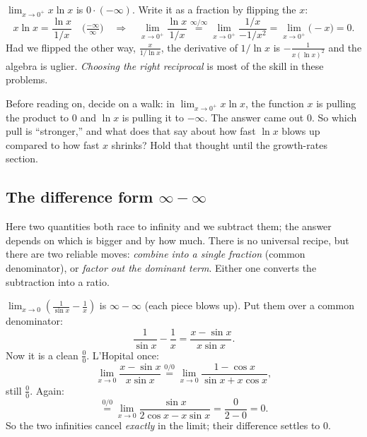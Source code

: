 \begin{example}\label{ch18:ex-xlnx}
$\displaystyle\lim_{x\to 0^+}x\ln x$ is $0\cdot(-\infty)$. Write it as a fraction by
flipping the $x$:
\[
x\ln x=\frac{\ln x}{1/x}\quad\Big(\tfrac{-\infty}{\infty}\Big)
\quad\Longrightarrow\quad
\lim_{x\to 0^+}\frac{\ln x}{1/x}\overset{\infty/\infty}{=}
\lim_{x\to 0^+}\frac{1/x}{-1/x^2}
=\lim_{x\to 0^+}\big(-x\big)=0.
\]
Had we flipped the other way, $\tfrac{x}{1/\ln x}$, the derivative of $1/\ln x$ is
$-\tfrac{1}{x(\ln x)^2}$ and the algebra is uglier. \emph{Choosing the right
reciprocal} is most of the skill in these problems.
\end{example}

\begin{walkbox}
Before reading on, decide on a walk: in $\lim_{x\to 0^+}x\ln x$, the function $x$ is
pulling the product to $0$ and $\ln x$ is pulling it to $-\infty$. The answer came out
$0$. So which pull is ``stronger,'' and what does that say about how fast $\ln x$ blows
up compared to how fast $x$ shrinks? Hold that thought until the growth-rates section.
\end{walkbox}

\subsection{The difference form $\infty-\infty$}

Here two quantities both race to infinity and we subtract them; the answer depends on
which is bigger and by how much. There is no universal recipe, but there are two
reliable moves: \emph{combine into a single fraction} (common denominator), or
\emph{factor out the dominant term}. Either one converts the subtraction into a ratio.

\begin{example}\label{ch18:ex-cscdiff}
$\displaystyle\lim_{x\to 0}\left(\frac{1}{\sin x}-\frac{1}{x}\right)$ is
$\infty-\infty$ (each piece blows up). Put them over a common denominator:
\[
\frac{1}{\sin x}-\frac{1}{x}=\frac{x-\sin x}{x\sin x}.
\]
Now it is a clean $\tfrac00$. L'Hopital once:
\[
\lim_{x\to 0}\frac{x-\sin x}{x\sin x}
\overset{0/0}{=}\lim_{x\to 0}\frac{1-\cos x}{\sin x+x\cos x},
\]
still $\tfrac00$. Again:
\[
\overset{0/0}{=}\lim_{x\to 0}\frac{\sin x}{2\cos x-x\sin x}
=\frac{0}{2-0}=0.
\]
So the two infinities cancel \emph{exactly} in the limit; their difference settles to
$0$.
\end{example}

